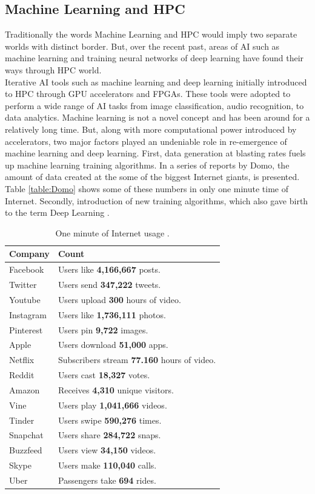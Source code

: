\documentclass[runningheads,a4paper]{llncs}
\begin{document}
{\subsection{Machine Learning and HPC}
Traditionally the words Machine Learning and HPC would imply two separate worlds with distinct border. But, over the recent past, areas of AI such as machine learning and training neural networks of deep learning have found their ways through HPC world.\\

Iterative AI tools such as machine learning and deep learning initially introduced to HPC through GPU accelerators and FPGAs. These tools were adopted to perform a wide range of AI tasks from image classification, audio recognition, to data analytics. Machine learning is not a novel concept and has been around for a relatively long time. But, along with more computational power introduced by accelerators, two major factors played an undeniable role in re-emergence of machine learning and deep learning. First, data generation at blasting rates fuels up machine learning training algorithms. In a series of reports by Domo, \cite{domo} the amount of data created at the some of the biggest Internet giants, is presented. Table \ref{table:Domo} shows some of these numbers in only one minute time of Internet. Secondly, introduction of new training algorithms, which also gave birth to the term Deep Learning \cite{hinton2006fast}.
\begin{table}
	\centering
	\caption{One minute of Internet usage \cite{domo}.}
	\begin{tabular}{ |p{3cm}|p{9cm}|  }
		\hline
		Company & Count \\
		\hline
		Facebook & Users like \textbf{4,166,667} posts.\\
		\hline
		Twitter & Users send \textbf{347,222} tweets.\\
		\hline
		Youtube & Users upload \textbf{300} hours of video.\\
		\hline
		Instagram & Users like \textbf{1,736,111} photos. \\
		\hline
		Pinterest & Users pin \textbf{9,722} images.\\
		\hline
		Apple & Users download  \textbf{51,000} apps.\\
		\hline
		Netflix & Subscribers stream  \textbf{77.160} hours of video.\\
		\hline
		Reddit & Users cast  \textbf{18,327} votes.\\
		\hline
		Amazon & Receives  \textbf{4,310} unique visitors.\\
		\hline
		Vine & Users play  \textbf{1,041,666} videos.\\
		\hline
		Tinder & Users swipe  \textbf{590,276} times.\\
		\hline
		Snapchat & Users share  \textbf{284,722} snaps.\\
		\hline
		Buzzfeed & Users view  \textbf{34,150} videos.\\
		\hline
		Skype & Users make  \textbf{110,040} calls.\\
		\hline
		Uber & Passengers take  \textbf{694} rides.\\
		\hline
		

\end{tabular}
\end{table}}
\end{document}
